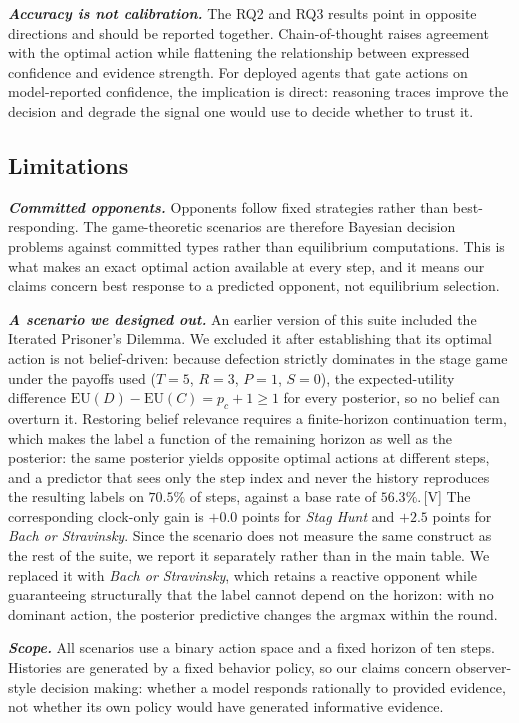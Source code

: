 \textbf{\textit{Accuracy is not calibration.}}
The RQ2 and RQ3 results point in opposite directions and should be reported
together. Chain-of-thought raises agreement with the optimal action while
flattening the relationship between expressed confidence and evidence strength.
For deployed agents that gate actions on model-reported confidence, the
implication is direct: reasoning traces improve the decision and degrade the
signal one would use to decide whether to trust it.

\subsection{Limitations}

\textbf{\textit{Committed opponents.}}
Opponents follow fixed strategies rather than best-responding. The
game-theoretic scenarios are therefore Bayesian decision problems against
committed types rather than equilibrium computations. This is what makes an
exact optimal action available at every step, and it means our claims concern
best response to a predicted opponent, not equilibrium selection.

\textbf{\textit{A scenario we designed out.}}
An earlier version of this suite included the Iterated Prisoner's Dilemma. We
excluded it after establishing that its optimal action is not belief-driven:
because defection strictly dominates in the stage game under the payoffs used
($T=5$, $R=3$, $P=1$, $S=0$), the expected-utility difference
$\mathrm{EU}(D)-\mathrm{EU}(C)=p_c+1\ge1$ for every posterior, so no belief can
overturn it. Restoring belief relevance requires a finite-horizon continuation
term, which makes the label a function of the remaining horizon as well as the
posterior: the same posterior yields opposite optimal actions at different
steps, and a predictor that sees only the step index and never the history
reproduces the resulting labels on $70.5\%$ of steps, against a base rate of
$56.3\%$.\,[V] The corresponding clock-only gain is $+0.0$ points for
\textit{Stag Hunt} and $+2.5$ points for \textit{Bach or Stravinsky}. Since
the scenario does not measure the same construct as the rest of the suite, we
report it separately rather than in the main table. We replaced it with
\textit{Bach or Stravinsky}, which retains a reactive opponent while
guaranteeing structurally that the label cannot depend on the horizon: with no
dominant action, the posterior predictive changes the argmax within the round.

\textbf{\textit{Scope.}}
All scenarios use a binary action space and a fixed horizon of ten steps.
Histories are generated by a fixed behavior policy, so our claims concern
observer-style decision making: whether a model responds rationally to
provided evidence, not whether its own policy would have generated informative
evidence.

